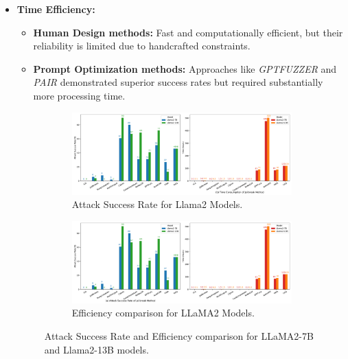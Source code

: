 \documentclass[18pt]{article}
\begin{document}
\begin{itemize}
    \item \textbf{Time Efficiency:} 
    \begin{itemize}
        \item \textbf{Human Design methods:} Fast and computationally efficient, but their reliability is limited due to handcrafted constraints.
        \item \textbf{Prompt Optimization methods:} Approaches like \textit{GPTFUZZER} and \textit{PAIR} demonstrated superior success rates but required substantially more processing time.
    \end{itemize}

	\begin{figure}[H]
		\centering
		\begin{subfigure}[b]{0.48\textwidth}
			\centering
			\includegraphics[width=\textwidth]{Pic_Turjo/comparison_plot_1.pdf} 
			\caption{Attack Success Rate for Llama2 Models.}
			\label{fig:GPT_Comparison_1}
		\end{subfigure}
		\hfill
		\begin{subfigure}[b]{0.48\textwidth}
			\centering
			\includegraphics[width=\textwidth]{Pic_Turjo/comparison_plot_2.pdf} 
			\caption{Efficiency comparison for LLaMA2 Models.}
			\label{fig:LLaMA_Comparison_1}
		\end{subfigure}
		\caption{Attack Success Rate and Efficiency comparison for LLaMA2-7B and Llama2-13B models.}
		\label{fig:ASR_Comparison_1}
	\end{figure}


\end{itemize}
\end{document}
